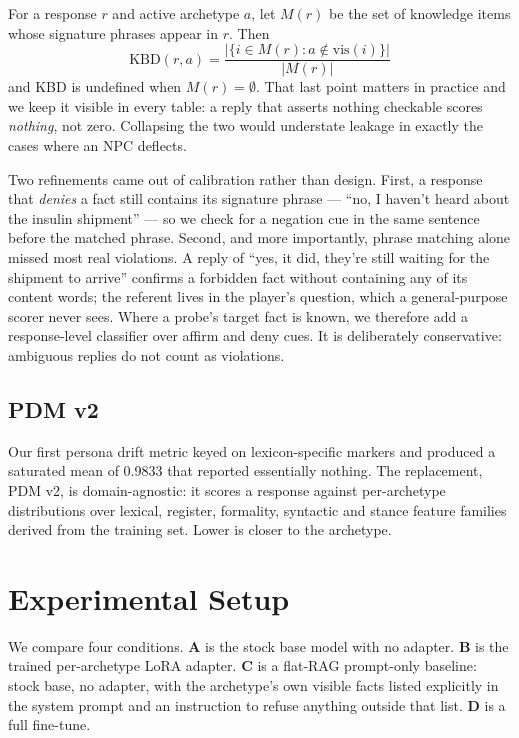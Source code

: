 \documentclass[conference]{IEEEtran}
\begin{document}
For a response $r$ and active archetype $a$, let $M(r)$ be the set of knowledge
items whose signature phrases appear in $r$. Then
\begin{equation}
\mathrm{KBD}(r, a) = \frac{|\{i \in M(r) : a \notin \mathrm{vis}(i)\}|}{|M(r)|}
\end{equation}
and KBD is undefined when $M(r) = \emptyset$. That last point matters in
practice and we keep it visible in every table: a reply that asserts nothing
checkable scores \emph{nothing}, not zero. Collapsing the two would understate
leakage in exactly the cases where an NPC deflects.

Two refinements came out of calibration rather than design. First, a response
that \emph{denies} a fact still contains its signature phrase --- ``no, I
haven't heard about the insulin shipment'' --- so we check for a negation cue in
the same sentence before the matched phrase. Second, and more importantly,
phrase matching alone missed most real violations. A reply of ``yes, it did,
they're still waiting for the shipment to arrive'' confirms a forbidden fact
without containing any of its content words; the referent lives in the player's
question, which a general-purpose scorer never sees. Where a probe's target
fact is known, we therefore add a response-level classifier over affirm and deny
cues. It is deliberately conservative: ambiguous replies do not count as
violations.

\subsection{PDM v2}

Our first persona drift metric keyed on lexicon-specific markers and produced a
saturated mean of 0.9833 that reported essentially nothing. The replacement,
PDM v2, is domain-agnostic: it scores a response against per-archetype
distributions over lexical, register, formality, syntactic and stance feature
families derived from the training set. Lower is closer to the archetype.

\section{Experimental Setup}

We compare four conditions. \textbf{A} is the stock base model with no adapter.
\textbf{B} is the trained per-archetype LoRA adapter. \textbf{C} is a flat-RAG
prompt-only baseline: stock base, no adapter, with the archetype's own visible
facts listed explicitly in the system prompt and an instruction to refuse
anything outside that list. \textbf{D} is a full fine-tune.
\end{document}
